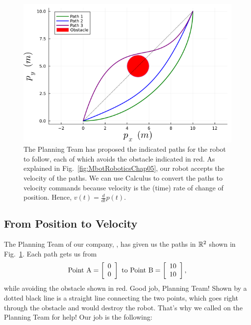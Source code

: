 \begin{figure}[htb]%
\centering
\includegraphics[width=0.6\columnwidth]{graphics/Chap05/MobileRobotPositionTrajectory.png}%
    \caption[]{The Planning Team has proposed the indicated paths for the robot to follow, each of which avoids the obstacle indicated in red. As explained in Fig.~\ref{fig:MbotRoboticsChap05}, our robot accepts the velocity of the paths. We can use Calculus to convert the paths to velocity commands because velocity is the (time) rate of change of position. Hence, $v(t) = \frac{d}{dt} p(t)$.}
    \label{fig:MobileRobotPositionTrajectory}
\end{figure}

\subsection{From Position to Velocity}

The Planning Team of our company, \company, has given us the paths in $\mathbb R^2$ shown in Fig.~\ref{fig:MobileRobotPositionTrajectory}. Each path gets us from 
$${\rm Point~ A}= \left[
\begin{array}{c}
0 \\
0 \\
\end{array}
\right]  \text{ to } {\rm Point~ B}= \left[
\begin{array}{c}
10 \\
10 \\
\end{array}
\right],$$ 
while avoiding the obstacle shown in red. Good job, Planning Team! Shown by a dotted black line is a straight line connecting the two points, which goes right through the obstacle and would destroy the robot. That's why we called on the Planning Team for help! Our job is the following:

\begin{center}
\setlength{\fboxrule}{2pt}  %
\end{center}


